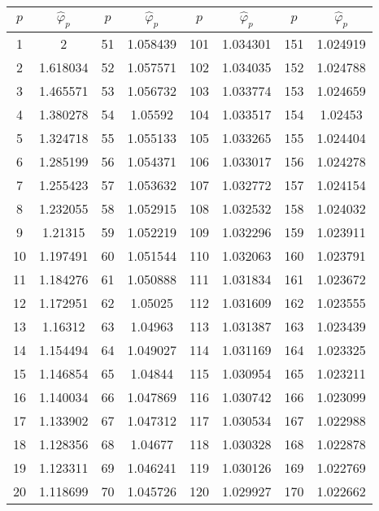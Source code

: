 \documentclass{article}
\begin{document}
    \begin{table}
      \centering
      \begin{tabular}{*{8}{c}}
        \toprule
        $p$ & $\hat{\varphi}_p$ & $p$ & $\hat{\varphi}_p$ & $p$ & $\hat{\varphi}_p$ & $p$ & $\hat{\varphi}_p$ \\
        \midrule
        1 & 2 & 51 & 1.058439 & 101 & 1.034301 & 151 & 1.024919 \\
        2 & 1.618034 & 52 & 1.057571 & 102 & 1.034035 & 152 & 1.024788 \\
        3 & 1.465571 & 53 & 1.056732 & 103 & 1.033774 & 153 & 1.024659 \\
        4 & 1.380278 & 54 & 1.05592 & 104 & 1.033517 & 154 & 1.02453 \\
        5 & 1.324718 & 55 & 1.055133 & 105 & 1.033265 & 155 & 1.024404 \\
        6 & 1.285199 & 56 & 1.054371 & 106 & 1.033017 & 156 & 1.024278 \\
        7 & 1.255423 & 57 & 1.053632 & 107 & 1.032772 & 157 & 1.024154 \\
        8 & 1.232055 & 58 & 1.052915 & 108 & 1.032532 & 158 & 1.024032 \\
        9 & 1.21315 & 59 & 1.052219 & 109 & 1.032296 & 159 & 1.023911 \\
        10 & 1.197491 & 60 & 1.051544 & 110 & 1.032063 & 160 & 1.023791 \\
        11 & 1.184276 & 61 & 1.050888 & 111 & 1.031834 & 161 & 1.023672 \\
        12 & 1.172951 & 62 & 1.05025 & 112 & 1.031609 & 162 & 1.023555 \\
        13 & 1.16312 & 63 & 1.04963 & 113 & 1.031387 & 163 & 1.023439 \\
        14 & 1.154494 & 64 & 1.049027 & 114 & 1.031169 & 164 & 1.023325 \\
        15 & 1.146854 & 65 & 1.04844 & 115 & 1.030954 & 165 & 1.023211 \\
        16 & 1.140034 & 66 & 1.047869 & 116 & 1.030742 & 166 & 1.023099 \\
        17 & 1.133902 & 67 & 1.047312 & 117 & 1.030534 & 167 & 1.022988 \\
        18 & 1.128356 & 68 & 1.04677 & 118 & 1.030328 & 168 & 1.022878 \\
        19 & 1.123311 & 69 & 1.046241 & 119 & 1.030126 & 169 & 1.022769 \\
        20 & 1.118699 & 70 & 1.045726 & 120 & 1.029927 & 170 & 1.022662 \\

\end{tabular}
\end{table}
\end{document}
